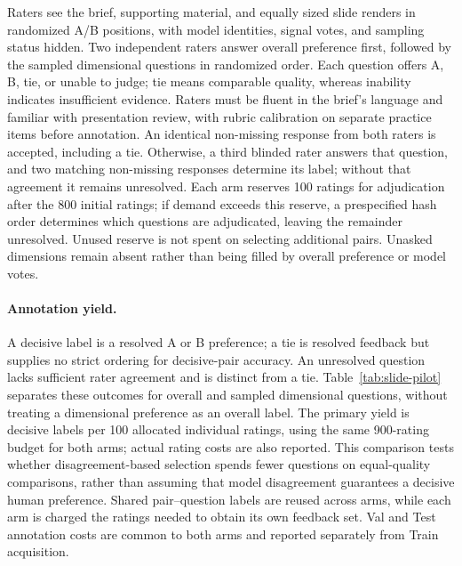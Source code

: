 Raters see the brief, supporting material, and equally sized slide renders in randomized A/B positions, with model identities, signal votes, and sampling status hidden.
Two independent raters answer overall preference first, followed by the sampled dimensional questions in randomized order.
Each question offers A, B, tie, or unable to judge; tie means comparable quality, whereas inability indicates insufficient evidence.
Raters must be fluent in the brief's language and familiar with presentation review, with rubric calibration on separate practice items before annotation.
An identical non-missing response from both raters is accepted, including a tie.
Otherwise, a third blinded rater answers that question, and two matching non-missing responses determine its label; without that agreement it remains unresolved.
Each arm reserves 100 ratings for adjudication after the 800 initial ratings; if demand exceeds this reserve, a prespecified hash order determines which questions are adjudicated, leaving the remainder unresolved.
Unused reserve is not spent on selecting additional pairs.
Unasked dimensions remain absent rather than being filled by overall preference or model votes.

\paragraph{Annotation yield.}
A decisive label is a resolved A or B preference; a tie is resolved feedback but supplies no strict ordering for decisive-pair accuracy.
An unresolved question lacks sufficient rater agreement and is distinct from a tie.
Table~\ref{tab:slide-pilot} separates these outcomes for overall and sampled dimensional questions, without treating a dimensional preference as an overall label.
The primary yield is decisive labels per 100 allocated individual ratings, using the same 900-rating budget for both arms; actual rating costs are also reported.
This comparison tests whether disagreement-based selection spends fewer questions on equal-quality comparisons, rather than assuming that model disagreement guarantees a decisive human preference.
Shared pair--question labels are reused across arms, while each arm is charged the ratings needed to obtain its own feedback set.
Val and Test annotation costs are common to both arms and reported separately from Train acquisition.

